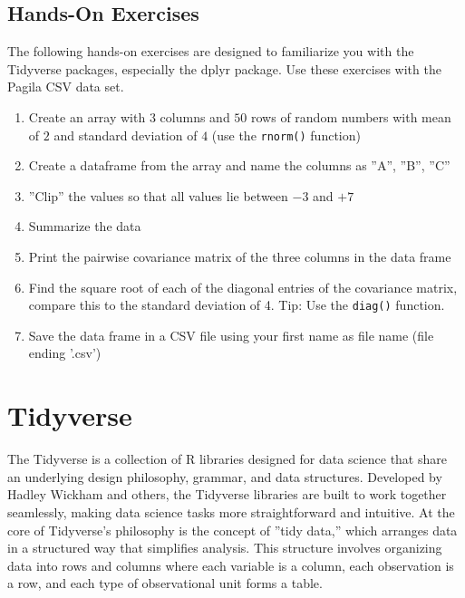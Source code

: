 \begin{tcolorbox}[colback=code]
\subsection*{Hands-On Exercises}

The following hands-on exercises are designed to familiarize you with the Tidyverse packages, especially the dplyr package. Use these exercises with the Pagila CSV data set.

\begin{enumerate}[nosep]
    \item Create an array with $3$ columns and $50$ rows of random numbers with mean of $2$ and standard deviation of $4$ (use the \texttt{rnorm()} function)
   \item Create a dataframe from the array and name the columns as ''A'', ''B'', ''C''
   \item ''Clip'' the values so that all values lie between $-3$ and $+7$
   \item Summarize the data
   \item Print the pairwise covariance matrix of the three columns in the data frame
   \item Find the square root of each of the diagonal entries of the covariance matrix, compare this to the standard deviation of 4. Tip: Use the \texttt{diag()} function.
   \item Save the data frame in a CSV file using your first name as file name (file ending '.csv')
\end{enumerate}
\end{tcolorbox}

\section{Tidyverse}

The Tidyverse is a collection of R libraries designed for data science that share an underlying design philosophy, grammar, and data structures. Developed by Hadley Wickham and others, the Tidyverse libraries are built to work together seamlessly, making data science tasks more straightforward and intuitive. At the core of Tidyverse's philosophy is the concept of ''tidy data,'' which arranges data in a structured way that simplifies analysis. This structure involves organizing data into rows and columns where each variable is a column, each observation is a row, and each type of observational unit forms a table.

